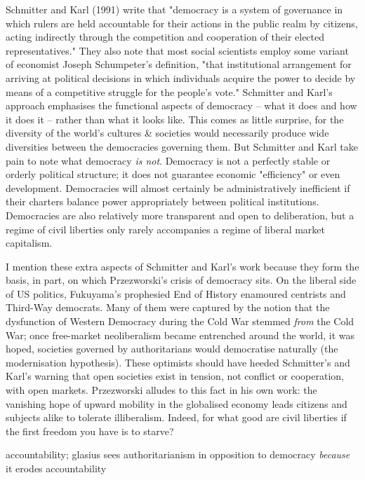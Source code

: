 \documentclass[12pt]{article}
\begin{document}
Schmitter and Karl (1991) write that "democracy is a system of governance in which rulers are held accountable for their actions in the public realm by citizens, acting indirectly through the competition and cooperation of their elected representatives." They also note that most social scientists employ some variant of economist Joseph Schumpeter's definition, "that institutional arrangement for arriving at political decisions in which individuals acquire the power to decide by means of a competitive struggle for the people's vote." Schmitter and Karl's approach emphasises the functional aspects of democracy -- what it does and how it does it -- rather than what it looks like. This comes as little surprise, for the diversity of the world's cultures & societies would necessarily produce wide diversities between the democracies governing them. But Schmitter and Karl take pain to note what democracy \textit{is not}. Democracy is not a perfectly stable or orderly political structure; it does not guarantee economic "efficiency" or even development. Democracies will almost certainly be administratively inefficient if their charters balance power appropriately between political institutions. Democracies are also relatively more transparent and open to deliberation, but a regime of civil liberties only rarely accompanies a regime of liberal market capitalism. 

I mention these extra aspects of Schmitter and Karl's work because they form the basis, in part, on which Przezworski's crisis of democracy sits. On the liberal side of US politics, Fukuyama's prophesied End of History enamoured centrists and Third-Way democrats. Many of them were captured by the notion that the dysfunction of Western Democracy during the Cold War stemmed \textit{from} the Cold War; once free-market neoliberalism became entrenched around the world, it was hoped, societies governed by authoritarians would democratise naturally (the modernisation hypothesis). These optimists should have heeded Schmitter's and Karl's warning that open societies exist in tension, not conflict or cooperation, with open markets. Przezworski alludes to this fact in his own work: the vanishing hope of upward mobility in the globalised economy leads citizens and subjects alike to tolerate illiberalism. Indeed, for what good are civil liberties if the first freedom you have is to starve?

accountability; glasius sees authoritarianism in opposition to democracy \textit{because} it erodes accountability
\end{document}

